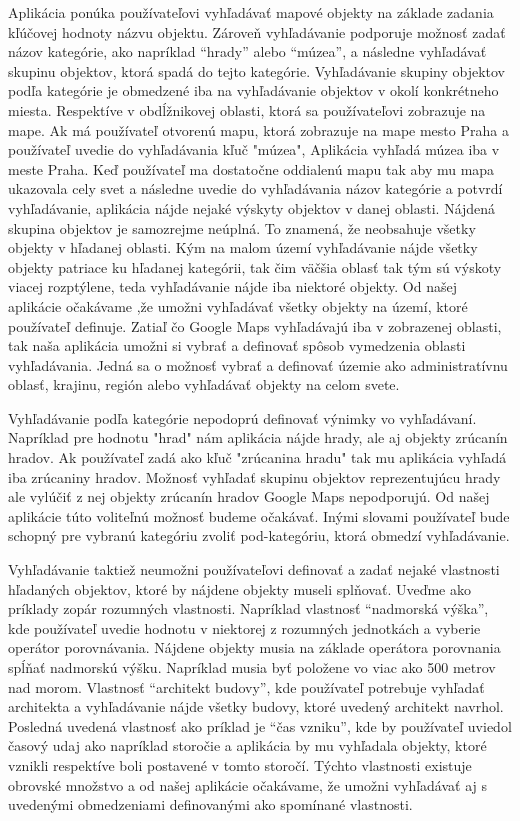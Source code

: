 Aplikácia ponúka používateľovi vyhľadávať mapové objekty na základe zadania kľúčovej hodnoty názvu objektu. Zároveň vyhľadávanie podporuje možnosť zadať názov kategórie, ako napríklad “hrady” alebo “múzea”, a následne vyhľadávať skupinu objektov, ktorá spadá do tejto kategórie. 
Vyhľadávanie skupiny objektov podľa kategórie je obmedzené iba na vyhľadávanie objektov v okolí konkrétneho miesta. Respektíve v obdĺžnikovej oblasti, ktorá sa používateľovi zobrazuje na mape. 
Ak má používateľ otvorenú mapu, ktorá zobrazuje na mape  mesto Praha a používateľ uvedie do vyhľadávania kľuč "múzea", 
Aplikácia vyhľadá múzea iba v meste Praha. Keď používateľ ma dostatočne oddialenú mapu tak aby mu mapa ukazovala cely svet a následne uvedie do vyhľadávania názov kategórie a potvrdí vyhľadávanie, 
aplikácia nájde nejaké výskyty objektov v danej oblasti. Nájdená skupina objektov je samozrejme neúplná. To znamená, že neobsahuje všetky objekty v hľadanej oblasti. Kým na malom území vyhľadávanie nájde všetky objekty patriace ku hľadanej kategórii, tak čim väčšia oblasť tak tým sú výskoty viacej rozptýlene, teda vyhľadávanie nájde iba niektoré objekty.  
Od našej aplikácie očakávame ,že umožni vyhľadávať všetky objekty na území, ktoré používateľ definuje. Zatiaľ čo Google Maps vyhľadávajú iba v zobrazenej oblasti, tak naša aplikácia umožni si vybrať a definovať spôsob vymedzenia oblasti vyhľadávania.  
Jedná sa o možnosť vybrať a definovať územie ako administratívnu oblasť, krajinu, región alebo vyhľadávať objekty na celom svete. 

Vyhľadávanie podľa kategórie nepodoprú definovať výnimky vo vyhľadávaní. Napríklad pre hodnotu "hrad" nám aplikácia nájde hrady, ale aj objekty zrúcanín hradov. 
Ak používateľ zadá ako kľuč "zrúcanina hradu" tak mu aplikácia vyhľadá iba zrúcaniny hradov. Možnosť vyhľadať skupinu objektov reprezentujúcu hrady ale vylúčiť z nej objekty zrúcanín hradov  Google Maps nepodporujú. 
Od našej aplikácie túto voliteľnú možnosť budeme očakávať. Inými slovami používateľ bude schopný pre vybranú kategóriu zvoliť pod-kategóriu, ktorá obmedzí vyhľadávanie. 

Vyhľadávanie taktiež neumožni používateľovi definovať a zadať nejaké vlastnosti hľadaných objektov, ktoré by nájdene objekty museli splňovať. Uveďme ako príklady zopár rozumných vlastnosti. 
Napríklad vlastnosť “nadmorská výška”, kde používateľ uvedie hodnotu v niektorej z rozumných jednotkách a vyberie operátor porovnávania. Nájdene objekty musia na základe operátora porovnania spĺňať nadmorskú výšku. Napríklad musia byť položene vo viac ako 500 metrov nad morom. 
Vlastnosť “architekt budovy”, kde používateľ potrebuje  
vyhľadať architekta a vyhľadávanie nájde všetky budovy, ktoré uvedený architekt navrhol. Posledná uvedená vlastnosť ako príklad je “čas vzniku”, kde by používateľ uviedol časový udaj ako napríklad storočie a aplikácia by mu vyhľadala objekty, ktoré vznikli respektíve boli postavené v tomto storočí. Týchto vlastnosti existuje obrovské množstvo a od našej aplikácie očakávame,
že umožni vyhľadávať aj s uvedenými obmedzeniami definovanými ako spomínané  vlastnosti. 


